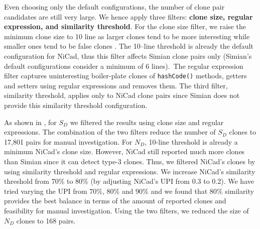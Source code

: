 \documentclass{sig-alternate-05-2015}
\begin{document}
Even choosing only the default configurations, the number of clone pair candidates are still very large. We hence apply three filters: \textbf{clone size, regular expression, and similarity threshold}. For the clone size filter, we raise the minimum clone size to 10 line as larger clones tend to be more interesting while smaller ones tend to be false clones \cite{Saini2016}. The 10--line threshold is already the default configuration for NiCad, thus this filter affects Simian clone pairs only (Simian's default configurations consider a minimum of 6 lines).~The regular expression filter captures uninteresting boiler-plate clones of \verb|hashCode()| methods, getters and setters using regular expressions and removes them. The third filter, similarity threshold, applies only to NiCad clone pairs since Simian does not provide this similarity threshold configuration. %

As shown in , for $S_D$ we filtered the results using clone size and regular expressions. The combination of the two filters reduce the number of $S_D$ clones to 17,801 pairs for manual investigation. 
For $N_D$, 10-line threshold is already a minimum NiCad's clone size. However, NiCad still reported much more clones than Simian since it can detect type-3 clones. Thus, we filtered NiCad's clones by using similarity threshold and regular expressions. We increase NiCad's similarity threshold from 70\% to 80\% (by adjusting NiCad's $\mathrm{UPI}$ from 0.3 to 0.2). We have tried varying the UPI from 70\%, 80\% and 90\% and we found that 80\% similarity provides the best balance in terms of the amount of reported clones and feasibility for manual investigation. Using the two filters, we reduced the size of $N_D$ clones to 168 pairs. 

\end{document}
